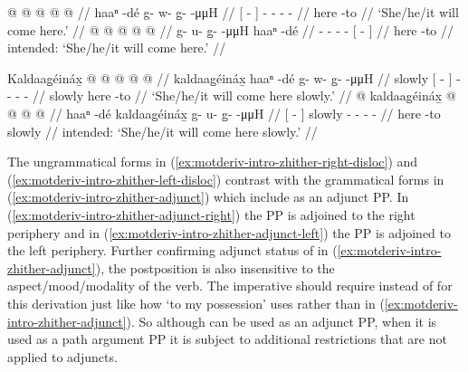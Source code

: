 \documentclass[12pt,letterpaper,oneside,article]{memoir}
\begin{document}
\pex\label{ex:motderiv-intro-zhither-right}%
\a\label{ex:motderiv-intro-zhither-right-insitu}%
%
\begingl
	\gla	{}  @ {} {}
		 @ {} @ {} @ {} @ {} //
	\glb	{} haaⁿ -dé {}
		g- w- g̱-  -μμH //
	\glc	{}[  - {}]
		- - -  - //
	\gld	{} here -to {}
		 {} {} {} {} //
	\glft	‘She/he/it will come here.’
		//
\endgl
\a\label{ex:motderiv-intro-zhither-right-disloc}%
\ljudge{*}%
%
\begingl
	\gla	{} @ {} @ {} @ {} @ {}
		{}  @ {} {} //
	\glb	g- u- g̱-  -μμH
		{} haaⁿ -dé {} //
	\glc	{}- - -  -
		{}[  - {}] //
	\gld	{} {} {} {} {}
		{} here -to {} //
	\glft	intended: ‘She/he/it will come here.’
		//
\endgl
\xe

\pex\label{ex:motderiv-intro-zhither-left}%
\a\label{ex:motderiv-intro-zhither-left-insitu}%
%
\begingl
	\gla	Kaldaag̱éináx̱
		{}  @ {} {}
		 @ {} @ {} @ {} @ {} //
	\glb	kaldaag̱éináx̱
		{} haaⁿ -dé {}
		g- w- g̱-  -μμH //
	\glc	slowly
		{}[  - {}]
		- - -  - //
	\gld	slowly
		{} here -to {}
		 {} {} {} {} //
	\glft	‘She/he/it will come here slowly.’
		//
\endgl
\a\label{ex:motderiv-intro-zhither-left-disloc}%
\ljudge{*}%
%
\begingl
	\gla	{}  @ {} {}
		kaldaag̱éináx̱
		 @ {} @ {} @ {} @ {} //
	\glb	{} haaⁿ -dé {}
		kaldaag̱éináx̱
		g- u- g̱-  -μμH //
	\glc	{}[  - {}]
		slowly
		- - -  - //
	\gld	{} here -to {}
		slowly
		 {} {} {} {} //
	\glft	intended: ‘She/he/it will come here slowly.’
		//
\endgl
\xe

The ungrammatical forms in (\ref{ex:motderiv-intro-zhither-right-disloc}) and (\ref{ex:motderiv-intro-zhither-left-disloc}) contrast with the grammatical forms in (\ref{ex:motderiv-intro-zhither-adjunct}) which include  as an adjunct PP.
In (\ref{ex:motderiv-intro-zhither-adjunct-right}) the PP  is adjoined to the right periphery and in (\ref{ex:motderiv-intro-zhither-adjunct-left}) the PP is adjoined to the left periphery.
Further confirming adjunct status of  in (\ref{ex:motderiv-intro-zhither-adjunct}), the postposition  is also insensitive to the aspect/mood/modality of the verb.
The imperative should require  instead of  for this derivation just like how  ‘to my possession’ uses  rather than  in (\ref{ex:motderiv-intro-zhither-adjunct}).
So although  can be used as an adjunct PP, when it is used as a path argument PP it is subject to additional restrictions that are not applied to adjuncts.
\end{document}
